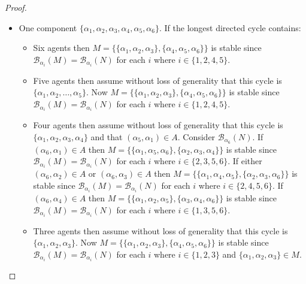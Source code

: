 \begin{proof}
\begin{itemize}
    \item One component $\{ \alpha_1, \alpha_2, \alpha_3, \alpha_4, \alpha_5, \alpha_6 \}$. If the longest directed cycle contains:
    \begin{itemize}
        \item Six agents then $M = \{ \{ \alpha_1, \alpha_2, \alpha_3 \}, \{ \alpha_4, \alpha_5, \alpha_6 \} \}$ is stable since $\mathscr{B}_{\alpha_i}(M) = \mathscr{B}_{\alpha_i}(N)$ for each $i$ where $i \in \{ 1, 2, 4, 5 \}$.
        
        \item Five agents then assume without loss of generality that this cycle is $\{ \alpha_1, \alpha_2, \dots, \alpha_5 \}$. Now $M = \{ \{ \alpha_1, \alpha_2, \alpha_3 \}, \{ \alpha_4, \alpha_5, \alpha_6 \} \}$ is stable since $\mathscr{B}_{\alpha_i}(M) = \mathscr{B}_{\alpha_i}(N)$ for each $i$ where $i \in \{ 1, 2, 4, 5\}$.
        
        \item Four agents then assume without loss of generality that this cycle is $\{ \alpha_1, \alpha_2, \alpha_3, \alpha_4 \}$ and that $( \alpha_5, \alpha_1 ) \in A$. Consider $\mathscr{B}_{\alpha_6}(N)$. If $( \alpha_6, \alpha_1 ) \in A$ then $M = \{ \{ \alpha_1, \alpha_5, \alpha_6 \}, \{ \alpha_2, \alpha_3, \alpha_4 \} \}$ is stable since $\mathscr{B}_{\alpha_i}(M) = \mathscr{B}_{\alpha_i}(N)$ for each $i$ where $i \in \{ 2, 3, 5, 6 \}$. If either $( \alpha_6, \alpha_2 ) \in A$ or $( \alpha_6, \alpha_3 ) \in A$ then $M = \{ \{ \alpha_1, \alpha_4, \alpha_5 \}, \{ \alpha_2, \alpha_3, \alpha_6 \} \}$ is stable since $\mathscr{B}_{\alpha_i}(M) = \mathscr{B}_{\alpha_i}(N)$ for each $i$ where $i \in \{ 2, 4, 5, 6 \}$. If $( \alpha_6, \alpha_4 ) \in A$ then $M = \{ \{ \alpha_1, \alpha_2, \alpha_5 \}, \{ \alpha_3, \alpha_4, \alpha_6 \} \}$ is stable since $\mathscr{B}_{\alpha_i}(M) = \mathscr{B}_{\alpha_i}(N)$ for each $i$ where $i \in \{ 1, 3, 5, 6 \}$.
        
        \item Three agents then assume without loss of generality that this cycle is $\{ \alpha_1, \alpha_2, \alpha_3 \}$. Now $M = \{ \{ \alpha_1, \alpha_2, \alpha_3 \}, \{ \alpha_4, \alpha_5, \alpha_6 \} \}$ is stable since $\mathscr{B}_{\alpha_i}(M) = \mathscr{B}_{\alpha_i}(N)$ for each $i$ where $i \in \{ 1, 2, 3 \}$ and $\{ \alpha_1, \alpha_2, \alpha_3 \} \in M$.
        

\end{itemize}
\end{itemize}
\end{proof}
